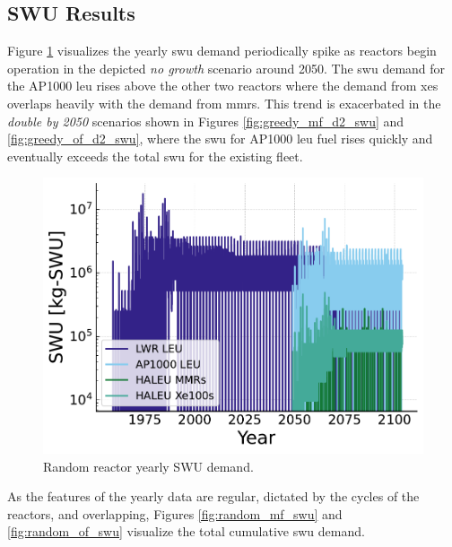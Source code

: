 \subsection{SWU Results}
\label{sec:random_swu}

Figure \ref{fig:swu_yearly_random} visualizes the yearly \gls{swu} demand periodically spike as reactors begin operation in the depicted \textit{no growth} scenario around 2050. The \gls{swu} demand for the AP1000 \gls{leu} rises above the other two reactors where the demand from \glspl{xe} overlaps heavily with the demand from \glspl{mmr}. This trend is exacerbated in the \textit{double by 2050} scenarios shown in Figures \ref{fig:greedy_mf_d2_swu} and \ref{fig:greedy_of_d2_swu}, where the \gls{swu} for AP1000 \gls{leu} fuel rises quickly and eventually exceeds the total \gls{swu} for the existing fleet.



\begin{figure}[H]
    \centering
    \includegraphics[scale=0.7]{images/results/swu/multi_drng_swu_by_fuel.pdf}
    \caption{Random reactor yearly SWU demand.}
    \label{fig:swu_yearly_random}
\end{figure}

As the features of the yearly data are regular, dictated by the cycles of the
reactors, and overlapping, Figures \ref{fig:random_mf_swu} and \ref{fig:random_of_swu} visualize the total cumulative \gls{swu} demand.


